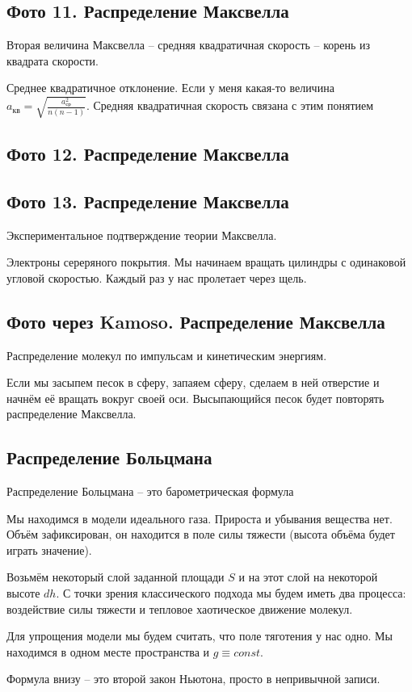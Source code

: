 \documentclass[12pt]{article}
\begin{document}
\subsection{Фото 11. Распределение Максвелла}
\par Вторая величина Максвелла -- средняя квадратичная скорость -- корень из квадрата скорости.
\par Среднее квадратичное отклонение. Если у меня какая-то величина $a_{\text{кв}} = \sqrt{\frac{a^2_{\text{ср}}}{n(n-1)}}$. Средняя квадратичная скорость связана с этим понятием
\subsection{Фото 12. Распределение Максвелла}
\subsection{Фото 13. Распределение Максвелла}
\par Экспериментальное подтверждение теории Максвелла.
\par Электроны сереряного покрытия. Мы начинаем вращать цилиндры с одинаковой угловой скоростью. Каждый раз у нас пролетает через щель.
\subsection{Фото через Kamoso. Распределение Максвелла}
\par Распределение молекул по импульсам и кинетическим энергиям.
\par Если мы засыпем песок в сферу, запаяем сферу, сделаем в ней отверстие и начнём её вращать вокруг своей оси. Высыпающийся песок будет повторять распределение Максвелла.
\subsection{Распределение Больцмана}
\par Распределение Больцмана -- это барометрическая формула
\par Мы находимся в модели идеального газа. Прироста и убывания вещества нет. Объём зафиксирован, он находится в поле силы тяжести (высота объёма будет играть значение).
\par Возьмём некоторый слой заданной площади $S$ и на этот слой на некоторой высоте $dh$. С точки зрения классического подхода мы будем иметь два процесса: воздействие силы тяжести и тепловое хаотическое движение молекул.
\par Для упрощения модели мы будем считать, что поле тяготения у нас одно. Мы находимся в одном месте пространства и $g \equiv const$.
\par Формула внизу -- это второй закон Ньютона, просто в непривычной записи.
\end{document}
